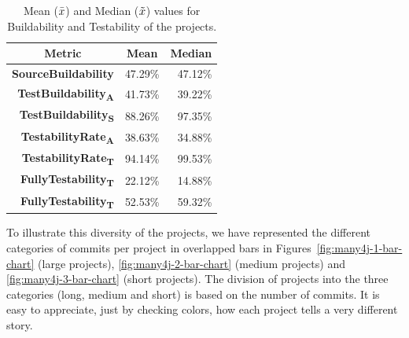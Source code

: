 \begin{table}[h]
    \centering
    \caption{Mean ($\bar{x}$) and Median ($\tilde{x}$) values for Buildability and Testability of the projects.}
        \label{table:results-3}
        \begin{tabular}{|r|r|r|}
            \hline
            \multicolumn{1}{|c|}{\textbf{Metric}} & \multicolumn{1}{c|}{\textbf{Mean}} & \multicolumn{1}{c|}{\textbf{Median}} \\ \hline
            \textbf{SourceBuildability}                         & 47.29\%                              & 47.12\%                                \\ \hline
            \textbf{TestBuildability\textsubscript{A}}          & 41.73\%                              & 39.22\%                                \\ \hline
            \textbf{TestBuildability\textsubscript{S}}          & 88.26\%                              & 97.35\%                                \\ \hline
            \textbf{TestabilityRate\textsubscript{A}}           & 38.63\%                              & 34.88\%                                \\ \hline
            \textbf{TestabilityRate\textsubscript{T}}           & 94.14\%                              & 99.53\%                                \\ \hline
            \textbf{FullyTestability\textsubscript{T}}          & 22.12\%                              & 14.88\%                                \\ \hline
            \textbf{FullyTestability\textsubscript{T}}          & 52.53\%                              & 59.32\%                                \\ \hline
    \end{tabular}
\end{table}


To illustrate this diversity of the projects, we have represented the different categories of commits per project in overlapped bars in Figures~\ref{fig:many4j-1-bar-chart} (large projects), \ref{fig:many4j-2-bar-chart} (medium projects) and \ref{fig:many4j-3-bar-chart} (short projects).
The division of projects into the three categories (long, medium and short) is based on the number of commits.
It is easy to appreciate, just by checking colors, how each project tells a very different story. 

